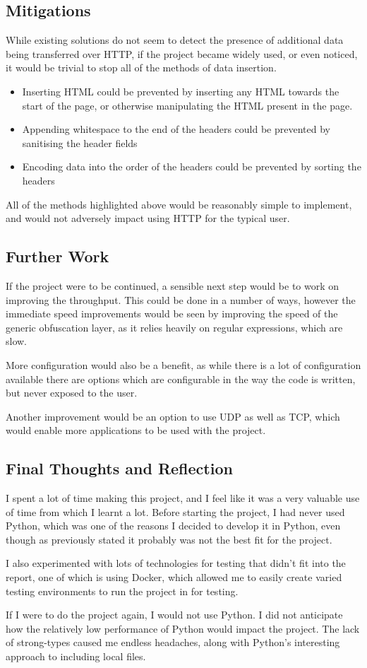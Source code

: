 \subsection{Mitigations}
While existing solutions do not seem to detect the presence of additional data being transferred over HTTP, if the project became widely used, or even noticed, it would be trivial to stop all of the methods of data insertion.\par
\begin{itemize}
    \item Inserting HTML could be prevented by inserting any HTML towards the start of the page, or otherwise manipulating the HTML present in the page.
    \item Appending whitespace to the end of the headers could be prevented by sanitising the header fields
    \item Encoding data into the order of the headers could be prevented by sorting the headers
\end{itemize}
All of the methods highlighted above would be reasonably simple to implement, and would not adversely impact using HTTP for the typical user.





\subsection{Further Work}
If the project were to be continued, a sensible next step would be to work on improving the throughput. This could be done in a number of ways, however the immediate speed improvements would be seen by improving the speed of the generic obfuscation layer, as it relies heavily on regular expressions, which are slow.\par
More configuration would also be a benefit, as while there is a lot of configuration available there are options which are configurable in the way the code is written, but never exposed to the user.\par
Another improvement would be an option to use UDP as well as TCP, which would enable more applications to be used with the project.
\subsection{Final Thoughts and Reflection}
I spent a lot of time making this project, and I feel like it was a very valuable use of time from which I learnt a lot. Before starting the project, I had never used Python, which was one of the reasons I decided to develop it in Python, even though as previously stated it probably was not the best fit for the project.\par
I also experimented with lots of technologies for testing that didn't fit into the report, one of which is using Docker, which allowed me to easily create varied testing environments to run the project in for testing.\par
If I were to do the project again, I would not use Python. I did not anticipate how the relatively low performance of Python would impact the project. The lack of strong-types caused me endless headaches, along with Python's interesting approach to including local files.
